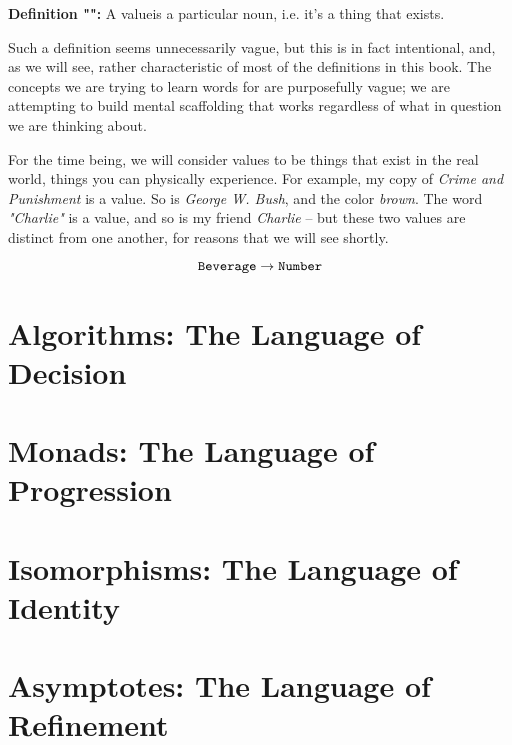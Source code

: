 \documentclass[12pt]{book}
\newcommand{\aside}[1]{#1}
\renewcommand{\value}[1]{\textit{#1}}
\newcommand{\what}{}
\newcommand{\defn}[2]{\renewcommand{\what}{#1}\textbf{Definition "\titlecap{#1}":} #2}
\begin{document}
\defn{value}{A \what is a particular noun, i.e. it's a thing that exists.}

\aside{Such a definition seems unnecessarily vague, but this is in fact intentional, and, as we will see, rather
characteristic of most of the definitions in this book. The concepts we are trying to learn words for are purposefully
vague; we are attempting to build mental scaffolding that works regardless of what in question we are thinking about.}

For the time being, we will consider values to be things that exist in the real world, things you can physically
experience. For example, my copy of \value{Crime and Punishment} is a value. So is \value{George W. Bush}, and the color
\value{brown}. The word \value{"Charlie"} is a value, and so is my friend \value{Charlie} -- but these two values are
distinct from one another, for reasons that we will see shortly.

$$
\text{\texttt{Beverage}} \to \verb"Number"
$$


\chapter{Algorithms: The Language of Decision}
\chapter{Monads: The Language of Progression}
\chapter{Isomorphisms: The Language of Identity}
\chapter{Asymptotes: The Language of Refinement}
\end{document}
